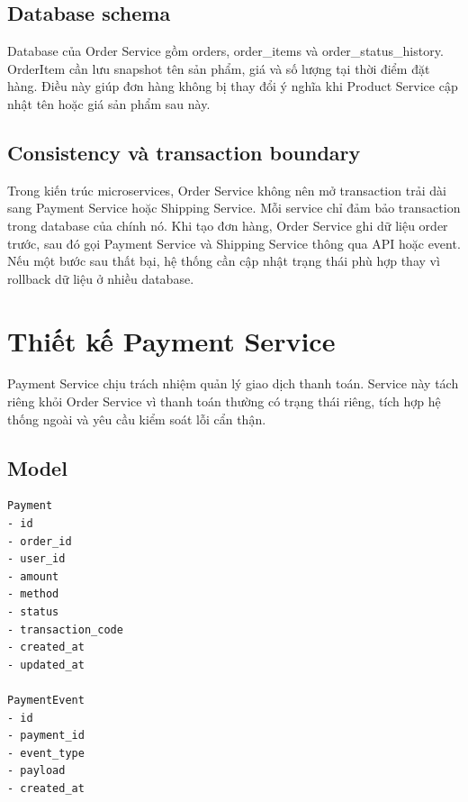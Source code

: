 \documentclass[../main.tex]{subfiles}
\begin{document}
\subsection{Database schema}
\label{subsection:2.6.5}

Database của Order Service gồm orders, order\_items và order\_status\_history. OrderItem cần lưu snapshot tên sản phẩm, giá và số lượng tại thời điểm đặt hàng. Điều này giúp đơn hàng không bị thay đổi ý nghĩa khi Product Service cập nhật tên hoặc giá sản phẩm sau này.

\subsection{Consistency và transaction boundary}
\label{subsection:2.6.6}

Trong kiến trúc microservices, Order Service không nên mở transaction trải dài sang Payment Service hoặc Shipping Service. Mỗi service chỉ đảm bảo transaction trong database của chính nó. Khi tạo đơn hàng, Order Service ghi dữ liệu order trước, sau đó gọi Payment Service và Shipping Service thông qua API hoặc event. Nếu một bước sau thất bại, hệ thống cần cập nhật trạng thái phù hợp thay vì rollback dữ liệu ở nhiều database.

\section{Thiết kế Payment Service}
\label{section:2.7}

Payment Service chịu trách nhiệm quản lý giao dịch thanh toán. Service này tách riêng khỏi Order Service vì thanh toán thường có trạng thái riêng, tích hợp hệ thống ngoài và yêu cầu kiểm soát lỗi cẩn thận.

\subsection{Model}
\label{subsection:2.7.1}

\begin{lstlisting}[caption={Model tổng quát của Payment Service}, label={lst:chapter2-payment-model}]
Payment
- id
- order_id
- user_id
- amount
- method
- status
- transaction_code
- created_at
- updated_at

PaymentEvent
- id
- payment_id
- event_type
- payload
- created_at
\end{lstlisting}
\end{document}

